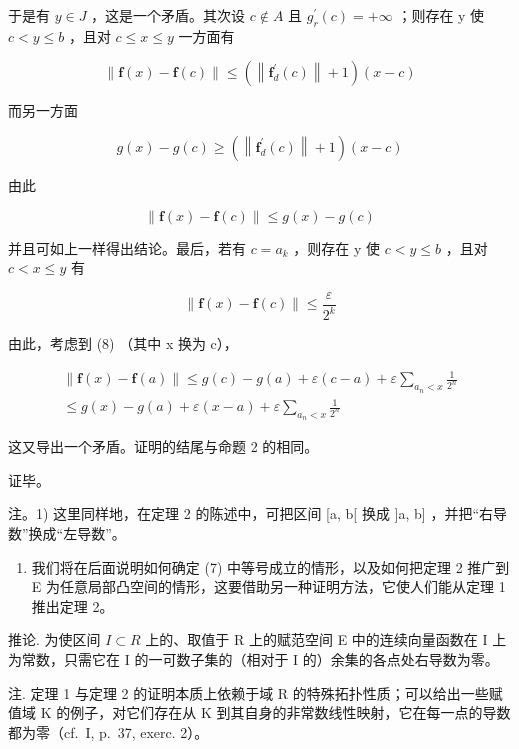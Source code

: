 于是有 \(y \in J\) ，这是一个矛盾。其次设 \(c \notin A\) 且 \(g_{r}^{\prime}(c) = +\infty\) ；则存在 y 使 \(c < y \leqslant b\) ，且对 \(c \leqslant x \leqslant y\) 一方面有

\[
\left\| \mathbf {f} (x) - \mathbf {f} (c) \right\| \leqslant \left(\left\| \mathbf {f} _ {d} ^ {\prime} (c) \right\| + 1\right) (x - c)
\]

而另一方面

\[
g (x) - g (c) \geqslant \left(\left\| \mathbf {f} _ {d} ^ {\prime} (c) \right\| + 1\right) (x - c)
\]

由此

\[
\| \mathbf {f} (x) - \mathbf {f} (c) \| \leqslant g (x) - g (c)
\]

并且可如上一样得出结论。最后，若有 \(c = a_{k}\) ，则存在 y 使 \(c < y \leqslant b\) ，且对 \(c < x \leqslant y\) 有

\[
\| \mathbf {f} (x) - \mathbf {f} (c) \| \leqslant \frac {\varepsilon}{2 ^ {k}}
\]

由此，考虑到 (8) （其中 x 换为 c），

\[
\begin{array}{c} \| \mathbf {f} (x) - \mathbf {f} (a) \| \leqslant g (c) - g (a) + \varepsilon (c - a) + \varepsilon \sum_ {a _ {n} <   x} \frac {1}{2 ^ {n}} \\ \leqslant g (x) - g (a) + \varepsilon (x - a) + \varepsilon \sum_ {a _ {n} <   x} \frac {1}{2 ^ {n}} \end{array}
\]

这又导出一个矛盾。证明的结尾与命题 2 的相同。

证毕。

注。1) 这里同样地，在定理 2 的陈述中，可把区间 {[}a, b{[} 换成 {]}a, b{]} ，并把“右导数”换成“左导数”。

\begin{enumerate}
\def\labelenumi{\arabic{enumi})}
\setcounter{enumi}{1}
\tightlist
\item
  我们将在后面说明如何确定 (7) 中等号成立的情形，以及如何把定理 2 推广到 E 为任意局部凸空间的情形，这要借助另一种证明方法，它使人们能从定理 1 推出定理 2。
\end{enumerate}

推论. 为使区间 \(I \subset R\) 上的、取值于 R 上的赋范空间 E 中的连续向量函数在 I 上为常数，只需它在 I 的一可数子集的（相对于 I 的）余集的各点处右导数为零。

注. 定理 1 与定理 2 的证明本质上依赖于域 R 的特殊拓扑性质；可以给出一些赋值域 K 的例子，对它们存在从 K 到其自身的非常数线性映射，它在每一点的导数都为零（cf.~I, p.~37, exerc. 2）。

